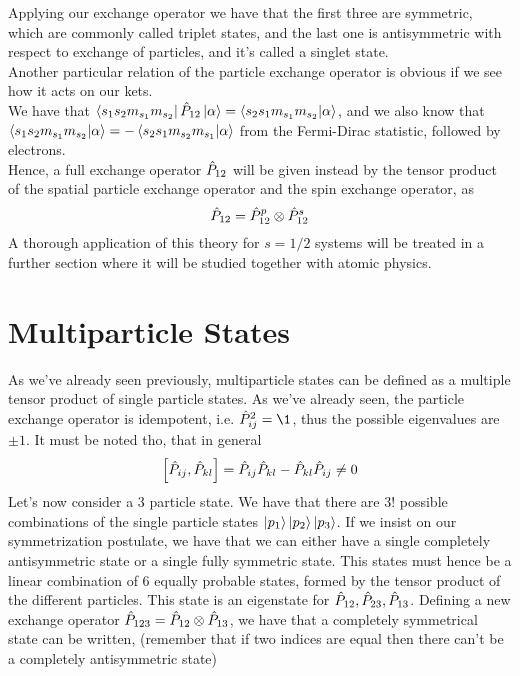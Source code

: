\documentclass[../qm.tex]{subfiles}
\begin{document}
	Applying our exchange operator we have that the first three are symmetric, which are commonly called triplet states, and the last one is antisymmetric with respect to exchange of particles, and it's called a singlet state.\\
	Another particular relation of the particle exchange operator is obvious if we see how it acts on our kets.\\
	We have that $\bra{s_1s_2m_{s_1}m_{s_2}}\hat{P}_{12}\ket{\alpha}=\bra{s_2s_1m_{s_1}m_{s_2}}\ket{\alpha}$, and we also know that $\bra{s_1s_2m_{s_1}m_{s_2}}\ket{\alpha}=-\bra{s_2s_1m_{s_2}m_{s_1}}\ket{\alpha}$ from the Fermi-Dirac statistic, followed by electrons.\\
	Hence, a full exchange operator $\hat{P}_{12}$ will be given instead by the tensor product of the spatial particle exchange operator and the spin exchange operator, as
	\begin{equation*}
		\hat{P}_{12}=\hat{P}_{12}^p\otimes\hat{P}_{12}^s
	\end{equation*}
	A thorough application of this theory for $s=1/2$ systems will be treated in a further section where it will be studied together with atomic physics.
	\section{Multiparticle States}
	As we've already seen previously, multiparticle states can be defined as a multiple tensor product of single particle states. As we've already seen, the particle exchange operator is idempotent, i.e. $\opr{P}_{ij}^2=\1$, thus the possible eigenvalues are $\pm1$. It must be noted tho, that in general
	\begin{equation}
		\comm{\opr{P}_{ij}}{\opr{P}_{kl}}=\opr{P}_{ij}\opr{P}_{kl}-\opr{P}_{kl}\opr{P}_{ij}\ne0
		\label{eq:exchangeopnoncomm}
	\end{equation}
	Let's now consider a 3 particle state. We have that there are $3!$ possible combinations of the single particle states $\ket{p_1}\ket{p_2}\ket{p_3}$. If we insist on our symmetrization postulate, we have that we can either have a single completely antisymmetric state or a single fully symmetric state. This states must hence be a linear combination of 6 equally probable states, formed by the tensor product of the different particles. This state is an eigenstate for $\hat{P}_{12}, \hat{P}_{23}, \hat{P}_{13}$. Defining a new exchange operator $\hat{P}_{123}=\hat{P}_{12}\otimes\hat{P}_{13}$, we have that a completely symmetrical state can be written, (remember that if two indices are equal then there can't be a completely antisymmetric state)
\end{document}
